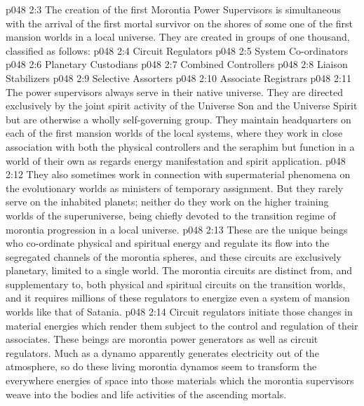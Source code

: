 \vs p048 2:3 The creation of the first Morontia Power Supervisors is simultaneous with the arrival of the first mortal survivor on the shores of some one of the first mansion worlds in a local universe. They are created in groups of one thousand, classified as follows:
\pc \vs p048 2:4 \bibnobreakspace Circuit Regulators
\vs p048 2:5 \bibnobreakspace System Co\hyp{}ordinators
\vs p048 2:6 \bibnobreakspace Planetary Custodians
\vs p048 2:7 \bibnobreakspace Combined Controllers
\vs p048 2:8 \bibnobreakspace Liaison Stabilizers
\vs p048 2:9 \bibnobreakspace Selective Assorters
\vs p048 2:10 \bibnobreakspace Associate Registrars
\pc \vs p048 2:11 The power supervisors always serve in their native universe. They are directed exclusively by the joint spirit activity of the Universe Son and the Universe Spirit but are otherwise a wholly self\hyp{}governing group. They maintain headquarters on each of the first mansion worlds of the local systems, where they work in close association with both the physical controllers and the seraphim but function in a world of their own as regards energy manifestation and spirit application.
\vs p048 2:12 They also sometimes work in connection with supermaterial phenomena on the evolutionary worlds as ministers of temporary assignment. But they rarely serve on the inhabited planets; neither do they work on the higher training worlds of the superuniverse, being chiefly devoted to the transition regime of morontia progression in a local universe.
\pc \vs p048 2:13 \bibnobreakspace {} These are the unique beings who co\hyp{}ordinate physical and spiritual energy and regulate its flow into the segregated channels of the morontia spheres, and these circuits are exclusively planetary, limited to a single world. The morontia circuits are distinct from, and supplementary to, both physical and spiritual circuits on the transition worlds, and it requires millions of these regulators to energize even a system of mansion worlds like that of Satania.
\vs p048 2:14 Circuit regulators initiate those changes in material energies which render them subject to the control and regulation of their associates. These beings are morontia power generators as well as circuit regulators. Much as a dynamo apparently generates electricity out of the atmosphere, so do these living morontia dynamos seem to transform the everywhere energies of space into those materials which the morontia supervisors weave into the bodies and life activities of the ascending mortals.
